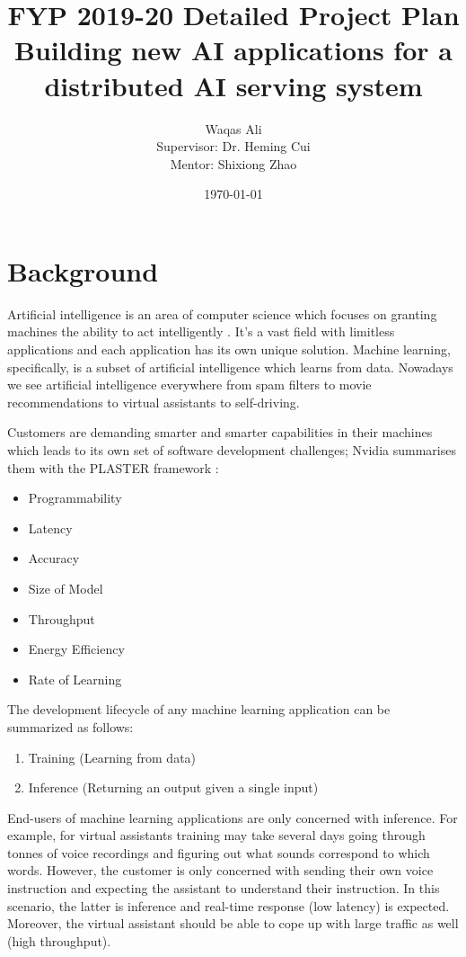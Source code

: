 \documentclass{article}
\title{FYP 2019-20 Detailed Project Plan \\ Building new AI applications for a distributed AI serving system}
\author{Waqas Ali\\{\small Supervisor: Dr. Heming Cui}\\{\small Mentor: Shixiong Zhao}}
\date{\today}
\begin{document}
\maketitle
 
\section{Background}
Artificial intelligence is an area of computer science which focuses on granting machines the ability to act intelligently \cite{McCarthy2007}. It's a vast field with limitless applications and each application has its own unique solution. Machine learning, specifically, is a subset of artificial intelligence which learns from data. \cite{Mitchell1997} Nowadays we see artificial intelligence everywhere from spam filters \cite{Androutsopoulos2000} to movie recommendations \cite{lekakos2008hybrid} to virtual assistants to self-driving.

Customers are demanding smarter and smarter capabilities in their machines which leads to its own set of software development challenges; Nvidia summarises them with the PLASTER \cite{Teich2018} framework :
\begin{itemize}
  \item Programmability
  \item Latency
  \item Accuracy
  \item Size of Model
  \item Throughput
  \item Energy Efficiency
  \item Rate of Learning
\end{itemize}

The development lifecycle of any machine learning application can be summarized as follows:
\begin{enumerate}
  \item Training (Learning from data)
  \item Inference (Returning an output given a single input)
\end{enumerate}

End-users of machine learning applications are only concerned with inference. For example, for virtual assistants training may take several days going through tonnes of voice recordings and figuring out what sounds correspond to which words. However, the customer is only concerned with sending their own voice instruction and expecting the assistant to understand their instruction. In this scenario, the latter is inference and real-time response (low latency) is expected. Moreover, the virtual assistant should be able to cope up with large traffic as well (high throughput).
\end{document}
